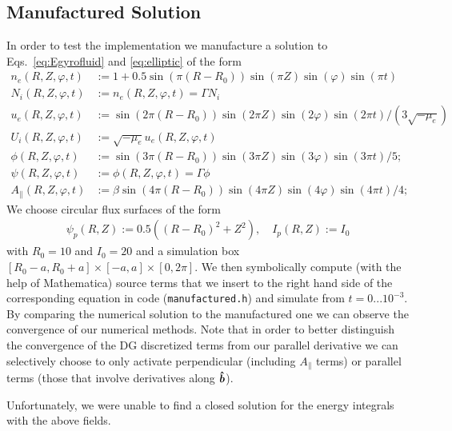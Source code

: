 \subsection{Manufactured Solution}
In order to test the implementation we manufacture a solution to Eqs.~\eqref{eq:Egyrofluid} and \eqref{eq:elliptic} of the form
\begin{align*}
n_e(R,Z,\varphi, t) &:= 1 + 0.5\sin(\pi(R-R_0))\sin(\pi Z)\sin(\varphi)\sin(\pi t) \\
N_i(R,Z,\varphi, t) &:= n_e(R,Z,\varphi,t) = \Gamma N_i  \\
u_e(R,Z,\varphi, t) &:= \sin(2\pi(R-R_0))\sin(2\pi Z)\sin(2\varphi)\sin(2\pi t)/(3\sqrt{-\mu_e}) \\
U_i(R,Z,\varphi, t) &:= \sqrt{-\mu_e}u_e(R,Z,\varphi,t) \\
\phi(R,Z,\varphi,t) &:= \sin(3\pi(R-R_0))\sin(3\pi Z)\sin(3\varphi)\sin(3\pi t)/5; \\
\psi(R,Z,\varphi,t) &:= \phi(R,Z,\varphi, t) = \Gamma \phi \\
A_\parallel( R,Z,\varphi,t) &:= \beta\sin(4\pi(R-R_0))\sin(4\pi Z)\sin(4\varphi)\sin(4\pi t)/4;
\end{align*}
We choose circular flux surfaces of the form
\begin{align*}
\psi_p(R,Z) :=0.5((R-R_0)^2 + Z^2),\quad
I_p(R,Z):=I_0
\end{align*}
with $R_0=10$ and $I_0=20$ and a simulation box $[R_0-a,R_0+a]\times[-a,a]\times[0,2\pi]$.
We then symbolically compute (with the help of Mathematica) source terms that we insert to the right hand side of
the corresponding equation in code (\texttt{manufactured.h}) and simulate from $t=0...10^{-3}$.
By comparing the numerical solution to the manufactured one we can observe the convergence of our numerical methods. Note that in order to better distinguish
the convergence of the DG discretized terms from our parallel derivative
we can selectively choose to only activate perpendicular (including $A_\parallel$ terms) or parallel terms (those that involve derivatives along $\bm{\hat{b}}$).

Unfortunately, we were unable to find a closed solution for the energy integrals with the above fields.


